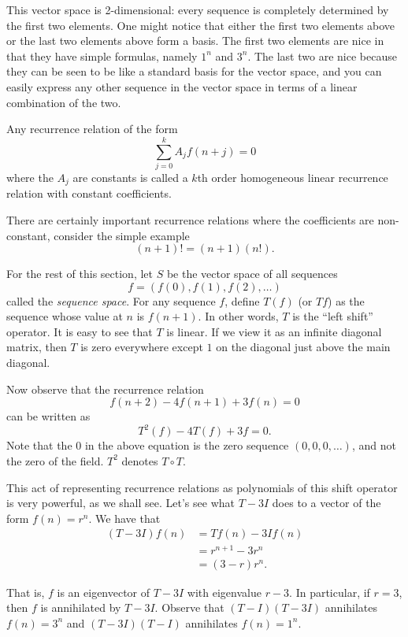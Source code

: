 This vector space is 2-dimensional: every sequence is completely determined by the first two elements. One might notice that either the first two elements above or the last two elements above form a basis. The first two elements are nice in that they have simple formulas, namely $1^n$ and $3^n$. The last two are nice because they can be seen to be like a standard basis for the vector space, and you can easily express any other sequence in the vector space in terms of a linear combination of the two.

\begin{definition}
Any recurrence relation of the form
\[\sum_{j = 0}^kA_jf(n + j) = 0\]
where the $A_j$ are constants is called a $k$th order homogeneous linear recurrence relation with constant coefficients.
\end{definition}

There are certainly important recurrence relations where the coefficients are non-constant, consider the simple example
\[(n + 1)! = (n+1)(n!).\]

For the rest of this section, let $S$ be the vector space of all sequences
\[f = (f(0), f(1), f(2), \dots)\] called the \textit{sequence space}. For any sequence $f$, define $T(f)$ (or $Tf$) as the sequence whose value at $n$ is $f(n + 1)$. In other words, $T$ is the ``left shift'' operator. It is easy to see that $T$ is linear. If we view it as an infinite diagonal matrix, then $T$ is zero everywhere except $1$ on the diagonal just above the main diagonal.

Now observe that the recurrence relation
\[f(n + 2) - 4f(n + 1) + 3f(n) = 0\] can be written as
\[T^2(f) - 4T(f) + 3f = 0.\] Note that the $0$ in the above equation is the zero sequence $(0, 0, 0, \dots)$, and not the zero of the field. $T^2$ denotes $T \circ T$.

This act of representing recurrence relations as polynomials of this shift operator is very powerful, as we shall see. Let's see what $T - 3I$ does to a vector of the form $f(n) = r^n$. We have that
\begin{align*}
(T - 3I)f(n) &= Tf(n) - 3If(n) \\
&= r^{n + 1} - 3r^n \\
&= (3 - r)r^n.
\end{align*}

That is, $f$ is an eigenvector of $T - 3I$ with eigenvalue $r - 3$. In particular, if $r = 3$, then $f$ is annihilated by $T - 3I$. Observe that $(T-I)(T-3I)$ annihilates $f(n) = 3^n$ and $(T-3I)(T-I)$ annihilates $f(n) = 1^n$.

